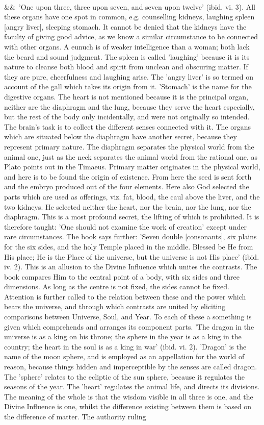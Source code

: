 \documentclass[12pt]{article}
\newcommand{\para}[1][]{\par\noindent\ifx&#1&\else\textsuperscript{\footnotesize #1}~\fi}
\begin{document}
\para 'One upon three, three upon seven, and seven upon twelve' (ibid. vi. 3). All these organs have one spot in common, e.g. counselling kidneys, laughing spleen [angry liver], sleeping stomach. It cannot be denied that the kidneys have the faculty of giving good advice, as we know a similar circumstance to be connected with other organs. A eunuch is of weaker intelligence than a woman; both lack the beard and sound judgment. The spleen is called 'laughing' because it is its nature to cleanse both blood and spirit from unclean and obscuring matter. If they are pure, cheerfulness and laughing arise. The 'angry liver' is so termed on account of the gall which takes its origin from it. 'Stomach' is the name for the digestive organs. The heart is not mentioned because it is the principal organ, neither are the diaphragm and the lung, because they serve the heart especially, but the rest of the body only incidentally, and were not originally so intended. The brain's task is to collect the different senses connected with it. The organs which are situated below the diaphragm have another secret, because they represent primary nature. The diaphragm separates the physical world from the animal one, just as the neck separates the animal world from the rational one, as Plato points out in the Timaeus. Primary matter originates in the physical world, and here is to be found the origin of existence. From here the seed is sent forth and the embryo produced out of the four elements. Here also God selected the parts which are used as offerings, viz. fat, blood, the caul above the liver, and the two kidneys. He selected neither the heart, nor the brain, nor the lung, nor the diaphragm. This is a most profound secret, the lifting of which is prohibited. It is therefore taught: 'One should not examine the work of creation' except under rare circumstances. The book says further: 'Seven double [consonants], six plains for the six sides, and the holy Temple placed in the middle. Blessed be He from His place; He is the Place of the universe, but the universe is not His place' (ibid. iv. 2). This is an allusion to the Divine Influence which unites the contrasts. The book compares Him to the central point of a body, with six sides and three dimensions. As long as the centre is not fixed, the sides cannot be fixed. Attention is further called to the relation between these and the power which bears the universe, and through which contrasts are united by eliciting comparisons between Universe, Soul, and Year. To each of these a something is given which comprehends and arranges its component parts. 'The dragon in the universe is as a king on his throne; the sphere in the year is as a king in the country; the heart in the soul is as a king in war' (ibid. vi. 2). 'Dragon' is the name of the moon sphere, and is employed as an appellation for the world of reason, because things hidden and imperceptible by the senses are called dragon. The 'sphere' relates to the ecliptic of the sun sphere, because it regulates the seasons of the year. The 'heart' regulates the animal life, and directs its divisions. The meaning of the whole is that the wisdom visible in all three is one, and the Divine Influence is one, whilst the difference existing between them is based on the difference of matter. The authority ruling 
\end{document}
